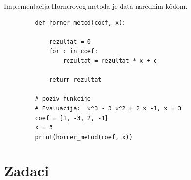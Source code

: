  Implementacija Hornerovog metoda je data narednim k\^odom. 
	 
	 \begin{verbatim}
	 	 def horner_metod(coef, x):
	 	   
	 	     rezultat = 0
	 	     for c in coef:
	 	         rezultat = rezultat * x + c
	 	     
	 	     return rezultat
	 	 
	 	 # poziv funkcije
	 	 # Evaluacija:  x^3 - 3 x^2 + 2 x -1, x = 3
	 	 coef = [1, -3, 2, -1]
	 	 x = 3
	 	 print(horner_metod(coef, x))
	 \end{verbatim}


 
 
 \section*{Zadaci}
 
